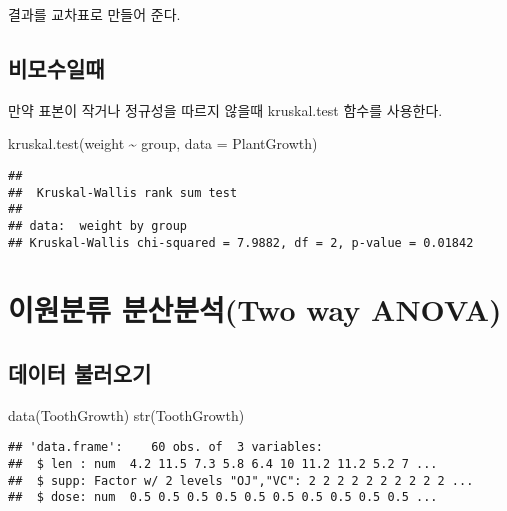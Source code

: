 \documentclass[
]{article}
\newenvironment{Shaded}{\begin{snugshade}}{\end{snugshade}}
\newcommand{\AttributeTok}[1]{\textcolor[rgb]{0.77,0.63,0.00}{#1}}
\newcommand{\FunctionTok}[1]{\textcolor[rgb]{0.00,0.00,0.00}{#1}}
\newcommand{\NormalTok}[1]{#1}
\newcommand{\SpecialCharTok}[1]{\textcolor[rgb]{0.00,0.00,0.00}{#1}}
\begin{document}
결과를 교차표로 만들어 준다.

\hypertarget{uxbe44uxbaa8uxc218uxc77cuxb54c}{%
\subsection{비모수일때}\label{uxbe44uxbaa8uxc218uxc77cuxb54c}}

만약 표본이 작거나 정규성을 따르지 않을때
kruskal.test 함수를 사용한다.

\begin{Shaded}
\begin{Highlighting}[]
\FunctionTok{kruskal.test}\NormalTok{(weight }\SpecialCharTok{\textasciitilde{}}\NormalTok{ group, }\AttributeTok{data =}\NormalTok{ PlantGrowth)}
\end{Highlighting}
\end{Shaded}

\begin{verbatim}
## 
##  Kruskal-Wallis rank sum test
## 
## data:  weight by group
## Kruskal-Wallis chi-squared = 7.9882, df = 2, p-value = 0.01842
\end{verbatim}

\hypertarget{uxc774uxc6d0uxbd84uxb958-uxbd84uxc0b0uxbd84uxc11dtwo-way-anova}{%
\section{이원분류 분산분석(Two way ANOVA)}\label{uxc774uxc6d0uxbd84uxb958-uxbd84uxc0b0uxbd84uxc11dtwo-way-anova}}

\hypertarget{uxb370uxc774uxd130-uxbd88uxb7ecuxc624uxae30-4}{%
\subsection{데이터 불러오기}\label{uxb370uxc774uxd130-uxbd88uxb7ecuxc624uxae30-4}}

\begin{Shaded}
\begin{Highlighting}[]
\FunctionTok{data}\NormalTok{(ToothGrowth)}
\FunctionTok{str}\NormalTok{(ToothGrowth)}
\end{Highlighting}
\end{Shaded}

\begin{verbatim}
## 'data.frame':    60 obs. of  3 variables:
##  $ len : num  4.2 11.5 7.3 5.8 6.4 10 11.2 11.2 5.2 7 ...
##  $ supp: Factor w/ 2 levels "OJ","VC": 2 2 2 2 2 2 2 2 2 2 ...
##  $ dose: num  0.5 0.5 0.5 0.5 0.5 0.5 0.5 0.5 0.5 0.5 ...
\end{verbatim}
\end{document}
